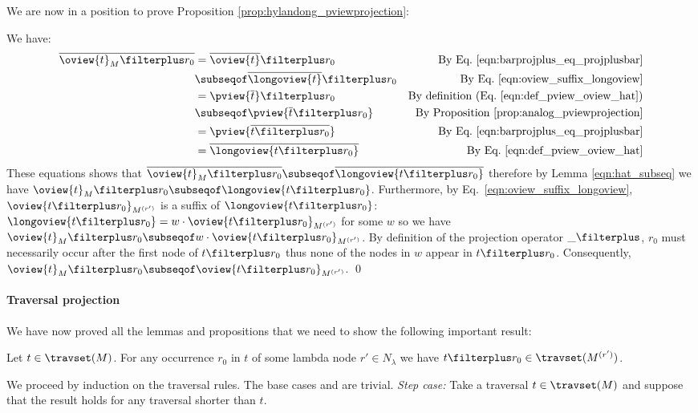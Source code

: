 We are now in a position to prove Proposition
\ref{prop:hylandong_pviewprojection}:


We have:
\begin{align*}
  \overline{\oview{t}_M\filterplus r_0}
        &= \overline{\oview{t}} \filterplus r_0 & \mbox{By Eq.\ \ref{eqn:barprojplus_eq_projplusbar}} \\
        &\subseqof \overline{\longoview{t}} \filterplus r_0 & \mbox{By Eq.\ \ref{eqn:oview_suffix_longoview}} \\
        &= \pview{\overline{t}} \filterplus r_0 & \mbox{By definition (Eq.\ \ref{eqn:def_pview_oview_hat})} \\
        &\subseqof \pview{\overline{t} \filterplus r_0}  & \mbox{By Proposition \ref{prop:analog_pviewprojection}} \\
        &= \pview{\overline{t \filterplus r_0}}  & \mbox{By Eq.\ \ref{eqn:barprojplus_eq_projplusbar}} \\
        &= \overline{\longoview{t \filterplus r_0}}  & \mbox{By Eq.\ \ref{eqn:def_pview_oview_hat}}
\end{align*}
These equations shows that $\overline{\oview{t}_M\filterplus r_0}
\subseqof \overline{\longoview{t \filterplus r_0}}$ therefore by
Lemma \ref{eqn:hat_subseq} we have $\oview{t}_M\filterplus r_0
\subseqof \longoview{t \filterplus r_0}$. Furthermore, by Eq.\
\ref{eqn:oview_suffix_longoview}, $\oview{t \filterplus
r_0}_{M^{(r')}}$ is a suffix of $\longoview{t \filterplus r_0}$:
$\longoview{t \filterplus r_0} = w \cdot \oview{t \filterplus
r_0}_{M^{(r')}}$ for some $w$ so we have $\oview{t}_M\filterplus r_0
\subseqof w \cdot \oview{t \filterplus r_0}_{M^{(r')}}$. By
definition of the projection operator $\_ \filterplus$, $r_0$ must
necessarily occur after the first node of $t \filterplus r_0$ thus
none of the nodes in $w$ appear in $t\filterplus r_0$. Consequently,
$\oview{t}_M\filterplus r_0 \subseqof \oview{t \filterplus
r_0}_{M^{(r')}}$. \qed

\paragraph{Traversal projection}
We have now proved all the lemmas and propositions that we need to
show the following important result:
\begin{proposition}
    \label{prop:trav_projection}
    Let $t \in \travset(M)$. For any occurrence $r_0$ in $t$ of some lambda node
    $r'\in N_\lambda$ we have $t\filterplus r_0 \in \travset(M^{(r')})$.
\end{proposition}
\proof
    We proceed by induction on the traversal rules. The base cases  and
    \rulenamet{Root} are trivial. \emph{Step case:} Take a traversal $t \in \travset(M)$ and suppose that the result holds for any traversal shorter than $t$.

